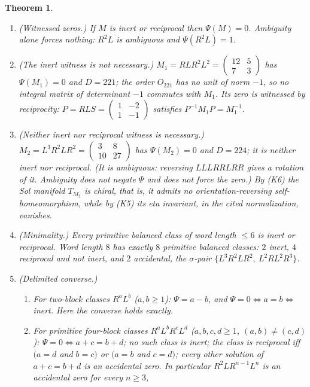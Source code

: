 \documentclass[11pt]{article}
\newtheorem{theorem}{Theorem}[section]
\theoremstyle{definition}
\begin{document}
\begin{theorem}
\label{thm:Z}
\begin{enumerate}[label=(\roman*)]
\item \textup{(Witnessed zeros.)}  If $M$ is inert or reciprocal then
$\Psi(M)=0$.  Ambiguity alone forces nothing: $R^2L$ is ambiguous and
$\Psi(R^2L)=1$.
\item \textup{(The inert witness is not necessary.)}
$M_1=RLR^2L^2=\begin{pmatrix}12&5\\7&3\end{pmatrix}$ has $\Psi(M_1)=0$
and $D=221$; the order $O_{221}$ has no unit of norm $-1$, so no
integral matrix of determinant $-1$ commutes with $M_1$.  Its zero is
witnessed by reciprocity: $P=RLS=\begin{pmatrix}1&-2\\1&-1\end{pmatrix}$
satisfies $P^{-1}M_1P=M_1^{-1}$.
\item \textup{(Neither inert nor reciprocal witness is necessary.)}
$M_2=L^3R^2LR^2=\begin{pmatrix}3&8\\10&27\end{pmatrix}$ has
$\Psi(M_2)=0$ and $D=224$; it is neither inert nor reciprocal.  (It is
ambiguous: reversing $LLLRRLRR$ gives a rotation of it.  Ambiguity does
not negate $\Psi$ and does not force the zero.)  By (K6) the Sol
manifold $T_{M_2}$ is chiral, that is, it admits no orientation-reversing
self-homeomorphism, while by (K5) its eta invariant, in the cited
normalization, vanishes.
\item \textup{(Minimality.)}  Every primitive balanced class of word length
$\leq6$ is inert or reciprocal.  Word length $8$ has exactly $8$
primitive balanced classes: $2$ inert, $4$ reciprocal and not inert, and
$2$ accidental, the $\sigma$-pair $\{L^3R^2LR^2,\ L^2RL^2R^3\}$.
\item \textup{(Delimited converse.)}
\begin{enumerate}[label=(\alph*)]
\item For two-block classes $R^aL^b$ ($a,b\geq1$): $\Psi=a-b$, and
$\Psi=0\iff a=b\iff$ inert.  Here the converse holds exactly.
\item For primitive four-block classes $R^aL^bR^cL^d$
($a,b,c,d\geq1$, $(a,b)\neq(c,d)$): $\Psi=0\iff a+c=b+d$; no such class
is inert; the class is reciprocal iff $(a=d$ and $b=c)$ or $(a=b$ and
$c=d)$; every other solution of $a+c=b+d$ is an accidental zero.  In
particular $R^2LR^{n-1}L^n$ is an accidental zero for every $n\geq3$,

\end{enumerate}
\end{enumerate}
\end{theorem}
\end{document}

